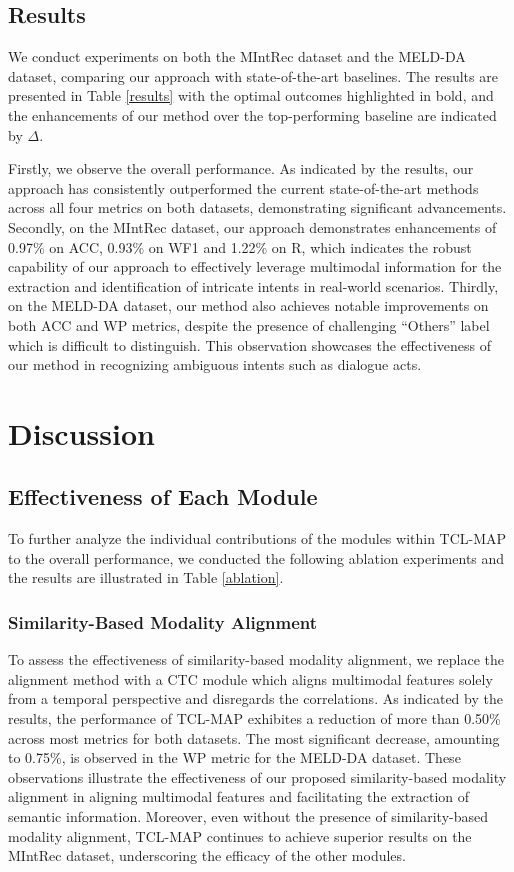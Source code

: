 \documentclass[letterpaper]{article}
\begin{document}
\subsection{Results}
We conduct experiments on both the MIntRec dataset and the MELD-DA dataset, comparing our approach with state-of-the-art baselines. The results are presented in Table \ref{results} with the optimal outcomes highlighted in bold, and the enhancements of our method over the top-performing baseline are indicated by $\Delta$.

Firstly, we observe the overall performance. As indicated by the results, our approach has consistently outperformed the current state-of-the-art methods across all four metrics on both datasets, demonstrating significant advancements. Secondly, on the MIntRec dataset, our approach demonstrates enhancements of 0.97\% on ACC, 0.93\% on WF1 and 1.22\% on R, which indicates the robust capability of our approach to effectively leverage multimodal information for the extraction and identification of intricate intents in real-world scenarios. Thirdly, on the MELD-DA dataset, our method also achieves notable improvements on both ACC and WP metrics, despite the presence of challenging ``Others'' label which is difficult to distinguish. This observation showcases the effectiveness of our method in recognizing ambiguous intents such as dialogue acts.

\section{Discussion}
\subsection{Effectiveness of Each Module}
To further analyze the individual contributions of the modules within TCL-MAP to the overall performance, we conducted the following ablation experiments and the results are illustrated in Table \ref{ablation}.


\subsubsection{Similarity-Based Modality Alignment}
To assess the effectiveness of similarity-based modality alignment, we replace the alignment method with a CTC module \cite{10.1145/1143844.1143891} which aligns multimodal features solely from a temporal perspective and disregards the correlations. As indicated by the results, the performance of TCL-MAP exhibites a reduction of more than 0.50\% across most metrics for both datasets. The most significant decrease, amounting to 0.75\%, is observed in the WP metric for the MELD-DA dataset. These observations illustrate the effectiveness of our proposed similarity-based modality alignment in aligning multimodal features and facilitating the extraction of semantic information. Moreover, even without the presence of similarity-based modality alignment, TCL-MAP continues to achieve superior results on the MIntRec dataset, underscoring the efficacy of the other modules.
\end{document}
